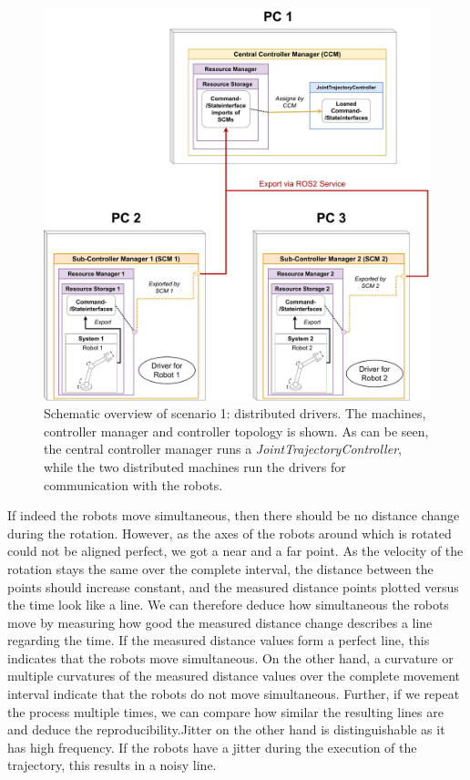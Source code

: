 \begin{figure}[h]
	\centering
	\includegraphics[width=1\textwidth]{Figures/c6/test_scenario_1.pdf}
	\caption{Schematic overview of scenario 1: distributed drivers. The machines, controller manager and controller topology is shown. As can be seen, the central controller manager runs a \textit{JointTrajectoryController}, while the two distributed machines run the drivers for communication with the robots. }
	\label{c6_fig_test_scenario_1}
\end{figure}
If indeed the robots move simultaneous, then there should be no distance change during the rotation. However, as the axes of the robots around which is rotated could not be aligned perfect, we got a near and a far point. As the velocity of the rotation stays the same over the complete interval, the distance between the points should increase constant, and the measured distance points plotted versus the time look like a line. We can therefore deduce how simultaneous the robots move by measuring how good the measured distance change describes a line regarding the time. If the measured distance values form a perfect line, this indicates that the robots move simultaneous. On the other hand, a curvature or multiple curvatures of the measured distance values over the complete movement interval indicate that the robots do not move simultaneous. Further, if we repeat the process multiple times, we can compare how similar the resulting lines are and deduce the reproducibility.Jitter on the other hand is distinguishable as it has  high frequency. If the robots have a jitter during the execution of the trajectory, this results in a noisy line.\newline
